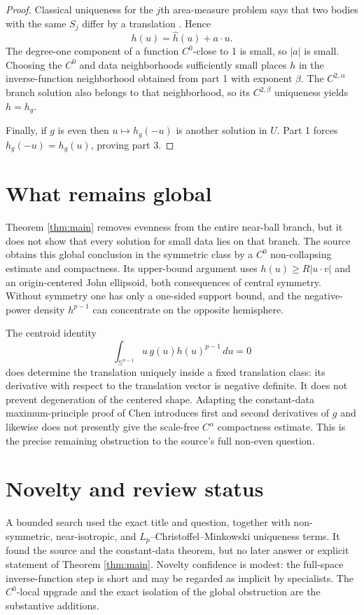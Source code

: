 \documentclass[11pt]{article}
\newcommand{\Sn}{\mathbb S^{n-1}}
\begin{document}
\begin{proof}
Classical uniqueness for the $j$th area-measure problem says that two
bodies with the same $S_j$ differ by a translation \cite{Schneider}.
Hence
\[
 h(u)=\widehat h(u)+a\cdot u.
\]
The degree-one component of a function $C^0$-close to 1 is small, so
$|a|$ is small.  Choosing the $C^0$ and data neighborhoods sufficiently
small places $h$ in the inverse-function neighborhood obtained from part 1
with exponent $\beta$.  The $C^{2,\alpha}$ branch solution also belongs to
that neighborhood, so its $C^{2,\beta}$ uniqueness yields $h=h_g$.

Finally, if $g$ is even then $u\mapsto h_g(-u)$ is another solution in
$U$.  Part 1 forces $h_g(-u)=h_g(u)$, proving part 3.
\end{proof}

\section{What remains global}

Theorem \ref{thm:main} removes evenness from the entire near-ball branch,
but it does not show that every solution for small data lies on that branch.
The source obtains this global conclusion in the symmetric class by a
$C^0$ non-collapsing estimate and compactness.  Its upper-bound argument
uses $h(u)\ge R|u\cdot v|$ and an origin-centered John ellipsoid, both
consequences of central symmetry.  Without symmetry one has only a
one-sided support bound, and the negative-power density $h^{p-1}$ can
concentrate on the opposite hemisphere.

The centroid identity
\[
  \int_{\Sn}u\,g(u)h(u)^{p-1}\,du=0
\]
does determine the translation uniquely inside a fixed translation class:
its derivative with respect to the translation vector is negative definite.
It does not prevent degeneration of the centered shape.  Adapting the
constant-data maximum-principle proof of Chen \cite{Chen} introduces first
and second derivatives of $g$ and likewise does not presently give the
scale-free $C^\alpha$ compactness estimate.  This is the precise remaining
obstruction to the source's full non-even question.

\section{Novelty and review status}

A bounded search used the exact title and question, together with
non-symmetric, near-isotropic, and $L_p$--Christoffel--Minkowski uniqueness
terms.  It found the source and the constant-data theorem, but no later
answer or explicit statement of Theorem \ref{thm:main}.  Novelty confidence
is modest: the full-space inverse-function step is short and may be regarded
as implicit by specialists.  The $C^0$-local upgrade and the exact isolation
of the global obstruction are the substantive additions.
\end{document}
